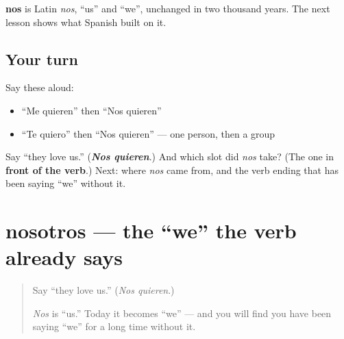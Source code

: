 \begin{cousinweb}
\textbf{nos} is Latin \emph{nos}, \textquotedblleft{}us\textquotedblright{} and \textquotedblleft{}we\textquotedblright{}, unchanged in two thousand years. The next lesson shows what Spanish built on it.
\end{cousinweb}

\subsection*{Your turn}
Say these aloud:

\begin{itemize}
\raggedright
  \item \textquotedblleft{}Me quieren\textquotedblright{} then \textquotedblleft{}Nos quieren\textquotedblright{}
  \item \textquotedblleft{}Te quiero\textquotedblright{} then \textquotedblleft{}Nos quieren\textquotedblright{} — one person, then a group
\end{itemize}

\begin{tcolorbox}[breakable,colback=teal!4,colframe=teal!35!black,title={Before you move on}]
Say \textquotedblleft{}they love us.\textquotedblright{} (\emph{\textbf{Nos quieren}}.) And which slot did \emph{nos} take? (The one in \textbf{front of the verb}.) Next: where \emph{nos} came from, and the verb ending that has been saying \textquotedblleft{}we\textquotedblright{} without it.
\end{tcolorbox}
\section[nosotros]{nosotros — the \textquotedblleft{}we\textquotedblright{} the verb already says}

\label{lesson:ES-C45-nosotros}



\begin{quote}
Say \textquotedblleft{}they love us.\textquotedblright{} (\emph{Nos quieren}.)

\emph{Nos} is \textquotedblleft{}us.\textquotedblright{} Today it becomes \textquotedblleft{}we\textquotedblright{} — and you will find you have been saying \textquotedblleft{}we\textquotedblright{} for a long time without it.
\end{quote}

